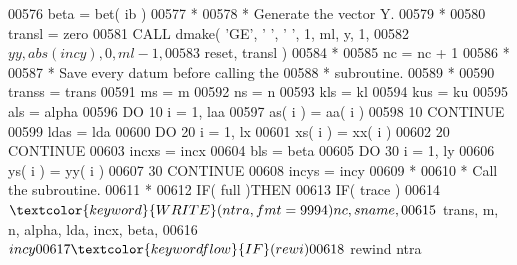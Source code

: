 \begin{DoxyCode}
00576                               beta = bet( ib )
00577 \textcolor{comment}{*}
00578 \textcolor{comment}{*                             Generate the vector Y.}
00579 \textcolor{comment}{*}
00580                               transl = zero
00581                               \textcolor{keyword}{CALL }dmake( \textcolor{stringliteral}{'GE'}, \textcolor{stringliteral}{' '}, \textcolor{stringliteral}{' '}, 1, ml, y, 1,
00582      $                                    yy, abs( incy ), 0, ml - 1,
00583      $                                    reset, transl )
00584 \textcolor{comment}{*}
00585                               nc = nc + 1
00586 \textcolor{comment}{*}
00587 \textcolor{comment}{*                             Save every datum before calling the}
00588 \textcolor{comment}{*                             subroutine.}
00589 \textcolor{comment}{*}
00590                               transs = trans
00591                               ms = m
00592                               ns = n
00593                               kls = kl
00594                               kus = ku
00595                               als = alpha
00596                               \textcolor{keywordflow}{DO} 10 i = 1, laa
00597                                  as( i ) = aa( i )
00598    10                         \textcolor{keywordflow}{CONTINUE}
00599                               ldas = lda
00600                               \textcolor{keywordflow}{DO} 20 i = 1, lx
00601                                  xs( i ) = xx( i )
00602    20                         \textcolor{keywordflow}{CONTINUE}
00603                               incxs = incx
00604                               bls = beta
00605                               \textcolor{keywordflow}{DO} 30 i = 1, ly
00606                                  ys( i ) = yy( i )
00607    30                         \textcolor{keywordflow}{CONTINUE}
00608                               incys = incy
00609 \textcolor{comment}{*}
00610 \textcolor{comment}{*                             Call the subroutine.}
00611 \textcolor{comment}{*}
00612                               \textcolor{keywordflow}{IF}( full )\textcolor{keywordflow}{THEN}
00613                                  \textcolor{keywordflow}{IF}( trace )
00614      $                              \textcolor{keyword}{WRITE}( ntra, fmt = 9994 )nc, sname,
00615      $                              trans, m, n, alpha, lda, incx, beta,
00616      $                              incy
00617                                  \textcolor{keywordflow}{IF}( rewi )
00618      $                              rewind ntra

\end{DoxyCode}
